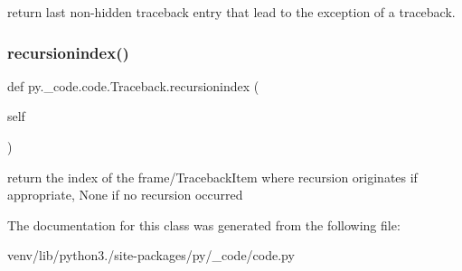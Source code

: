 \begin{DoxyVerb}return last non-hidden traceback entry that lead
to the exception of a traceback.
\end{DoxyVerb}
 \mbox{\label{classpy_1_1__code_1_1code_1_1_traceback_a282dee22b5c7c04e9be93bad6079b561}} 
\subsubsection{\texorpdfstring{recursionindex()}{recursionindex()}}
{\footnotesize\ttfamily def py.\+\_\+code.\+code.\+Traceback.\+recursionindex (\begin{DoxyParamCaption}\item[{}]{self }\end{DoxyParamCaption})}

\begin{DoxyVerb}return the index of the frame/TracebackItem where recursion
    originates if appropriate, None if no recursion occurred
\end{DoxyVerb}
 

The documentation for this class was generated from the following file\+:\begin{DoxyCompactItemize}
\item 
venv/lib/python3./site-\/packages/py/\+\_\+code/code.\+py\end{DoxyCompactItemize}
